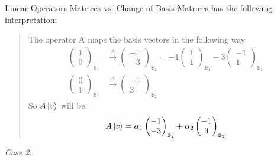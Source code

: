\begin{example}{Linear Operators Matrices vs. Change of Basis Matrices}
	has the following interpretation:
	\begin{quote}
		The operator A maps the basis vectors in the following way
		\begin{align*}
			\begin{pmatrix}
				1	\\
				0	
			\end{pmatrix}_{\mathbb{B}_1} & \xrightarrow{A} 
			\begin{pmatrix}
				-1	\\
				-3
			\end{pmatrix}_{\mathbb{B}_2} = 
			-1 \begin{pmatrix}
				1	\\
				1
			\end{pmatrix}_{\mathbb{B}_1}
			-3 \begin{pmatrix}
				-1	\\
				1
			\end{pmatrix}_{\mathbb{B}_1}\\
			\begin{pmatrix}
				0	\\
				1	
			\end{pmatrix}_{\mathbb{B}_1} & \xrightarrow{A} \begin{pmatrix}
				-1	\\
				3
			\end{pmatrix}_{\mathbb{B}_2}
		\end{align*}
		So $ A\ket{v} $ will be:
		\[ A\ket{v} = 
		\alpha_1 \begin{pmatrix}
			-1	\\
			-3
		\end{pmatrix}_{\mathbb{B}_2} + 
		\alpha_2 \begin{pmatrix}
			-1	\\
			3
		\end{pmatrix}_{\mathbb{B}_2}
		 \]
	\end{quote}
	
	\emph{Case 2.}
	

\end{example}
